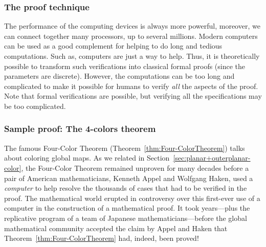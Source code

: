 \subsubsection{The proof technique}

The performance of the computing devices is always more powerful,
moreover, we can connect together many processors, up to several millions.
Modern computers can be used as a good complement for helping to do long and tedious computations. 
Such as, computers are just a way to help. 
Thus, it is theoretically possible to transform such verifications into classical formal proofs (since the parameters are discrete).
However, the computations can be too long and complicated to make it possible for humans to verify \textit{all} the aspects of the proof.
Note that formal verifications are possible, but verifying all the specifications may be too complicated. 


\subsubsection{Sample proof: The 4-colors theorem}

The famous Four-Color Theorem
(Theorem~\ref{thm:Four-ColorTheorem}) talks about coloring
global maps.  As we related in
Section~\ref{sec:planar+outerplanar-color}, the Four-Color Theorem
remained unproven for many decades before a pair of American
mathematicians, Kenneth Appel  and Wolfgang
Haken,  used a {\it computer} to help resolve
the thousands of cases that had to be verified in the proof.  The
mathematical world erupted in controversy over this first-ever use of
a computer in the construction of a mathematical proof.  It took
years---plus the replicative program of a team of Japanese
mathematicians---before the global mathematical community accepted the
claim by Appel and Haken that Theorem~\ref{thm:Four-ColorTheorem} had,
indeed, been proved!


